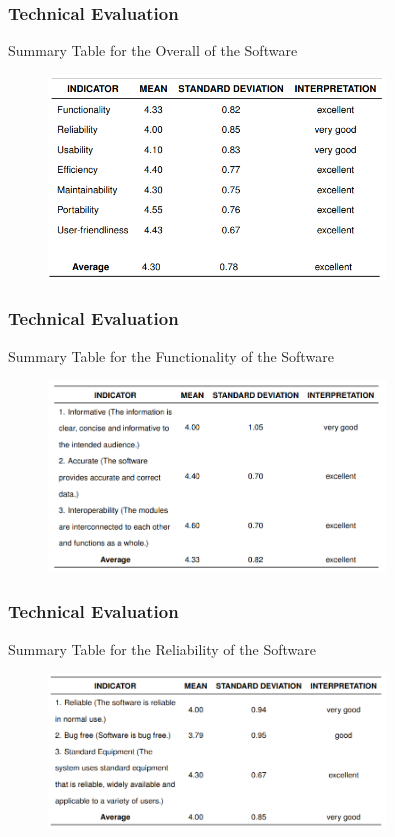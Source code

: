 \documentclass{beamer}
\begin{document}
\begin{frame}
	\frametitle{Technical Evaluation}
	\begin{block}{Summary Table for the Overall of the Software}
		\begin{figure}
			\includegraphics[width=0.8\textwidth]{figures/res_tech_overall.png}
		\end{figure}
	\end{block}
\end{frame}

\begin{frame}
	\frametitle{Technical Evaluation}
	\begin{block}{Summary Table for the Functionality of the Software}
		\begin{figure}
			\includegraphics[width=0.8\textwidth]{figures/res_tech_functionality.png}
		\end{figure}
	\end{block}
\end{frame}

\begin{frame}
	\frametitle{Technical Evaluation}
	\begin{block}{Summary Table for the Reliability of the Software}
		\begin{figure}
			\includegraphics[width=0.8\textwidth]{figures/res_tech_reliability.png}
		\end{figure}
	\end{block}
\end{frame}
\end{document}
